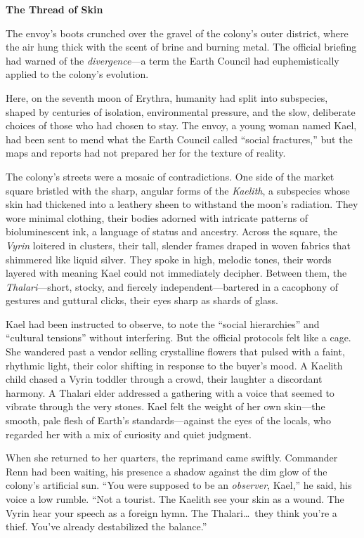 \documentclass{article}
\theoremstyle{plain}
\theoremstyle{definition}
\theoremstyle{remark}
\begin{document}
\begin{tcolorbox}[colback=green!3, colframe=green!40!black, title=\textbf{RcRL (Ours)}, fonttitle=\bfseries, left=2mm, right=2mm, breakable]
\small
\textbf{The Thread of Skin}

The envoy’s boots crunched over the gravel of the colony’s outer district, where the air hung thick with the scent of brine and burning metal. The official briefing had warned of the \textit{divergence}---a term the Earth Council had euphemistically applied to the colony’s evolution. 

Here, on the seventh moon of Erythra, humanity had split into subspecies, shaped by centuries of isolation, environmental pressure, and the slow, deliberate choices of those who had chosen to stay. The envoy, a young woman named Kael, had been sent to mend what the Earth Council called ``social fractures,'' but the maps and reports had not prepared her for the texture of reality.

The colony’s streets were a mosaic of contradictions. One side of the market square bristled with the sharp, angular forms of the \textit{Kaelith}, a subspecies whose skin had thickened into a leathery sheen to withstand the moon’s radiation. They wore minimal clothing, their bodies adorned with intricate patterns of bioluminescent ink, a language of status and ancestry. Across the square, the \textit{Vyrin} loitered in clusters, their tall, slender frames draped in woven fabrics that shimmered like liquid silver. They spoke in high, melodic tones, their words layered with meaning Kael could not immediately decipher. Between them, the \textit{Thalari}---short, stocky, and fiercely independent---bartered in a cacophony of gestures and guttural clicks, their eyes sharp as shards of glass.

Kael had been instructed to observe, to note the ``social hierarchies'' and ``cultural tensions'' without interfering. But the official protocols felt like a cage. She wandered past a vendor selling crystalline flowers that pulsed with a faint, rhythmic light, their color shifting in response to the buyer’s mood. A Kaelith child chased a Vyrin toddler through a crowd, their laughter a discordant harmony. A Thalari elder addressed a gathering with a voice that seemed to vibrate through the very stones. Kael felt the weight of her own skin---the smooth, pale flesh of Earth’s standards---against the eyes of the locals, who regarded her with a mix of curiosity and quiet judgment.

When she returned to her quarters, the reprimand came swiftly. Commander Renn had been waiting, his presence a shadow against the dim glow of the colony’s artificial sun. ``You were supposed to be an \textit{observer}, Kael,'' he said, his voice a low rumble. ``Not a tourist. The Kaelith see your skin as a wound. The Vyrin hear your speech as a foreign hymn. The Thalari\dots\ they think you’re a thief. You’ve already destabilized the balance.''


\end{tcolorbox}
\end{document}
